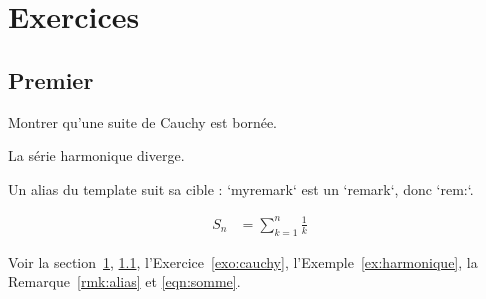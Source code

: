 \section{Exercices}\label{exercices} %

\subsection{Premier}\label{sec:premier} %

\begin{exercise}[label=exo:cauchy] %
  Montrer qu'une suite de Cauchy est bornée.
\end{exercise}

\begin{example}[label=ex:harmonique] %
  La série harmonique diverge.
\end{example}

\begin{myremark}[label=rmk:alias] %
  Un alias du template suit sa cible : `myremark` est un `remark`, donc `rem:`.
\end{myremark}

\begin{align}
  S_n &= \sum_{k=1}^n \frac1k \label{eqn:somme} %
\end{align}

Voir la section~\ref{exercices}, \ref{sec:premier}, l'Exercice~\ref{exo:cauchy},
l'Exemple~\ref{ex:harmonique}, la Remarque~\ref{rmk:alias} et \eqref{eqn:somme}.

